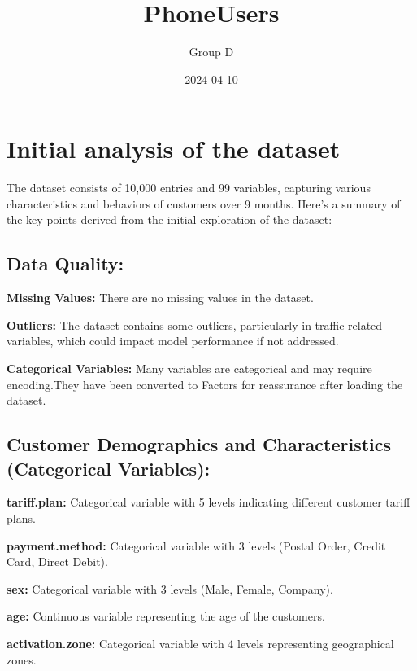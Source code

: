\documentclass[
]{article}
\title{PhoneUsers}
\author{Group D}
\date{2024-04-10}
\begin{document}
\maketitle

\hypertarget{initial-analysis-of-the-dataset}{%
\section{Initial analysis of the
dataset}\label{initial-analysis-of-the-dataset}}

The dataset consists of 10,000 entries and 99 variables, capturing
various characteristics and behaviors of customers over 9 months. Here's
a summary of the key points derived from the initial exploration of the
dataset:

\hypertarget{data-quality}{%
\subsection{Data Quality:}\label{data-quality}}

\textbf{Missing Values:} There are no missing values in the dataset.

\textbf{Outliers:} The dataset contains some outliers, particularly in
traffic-related variables, which could impact model performance if not
addressed.

\textbf{Categorical Variables:} Many variables are categorical and may
require encoding.They have been converted to Factors for reassurance
after loading the dataset.

\hypertarget{customer-demographics-and-characteristics-categorical-variables}{%
\subsection{Customer Demographics and Characteristics (Categorical
Variables):}\label{customer-demographics-and-characteristics-categorical-variables}}

\textbf{tariff.plan:} Categorical variable with 5 levels indicating
different customer tariff plans.

\textbf{payment.method:} Categorical variable with 3 levels (Postal
Order, Credit Card, Direct Debit).

\textbf{sex:} Categorical variable with 3 levels (Male, Female,
Company).

\textbf{age:} Continuous variable representing the age of the customers.

\textbf{activation.zone:} Categorical variable with 4 levels
representing geographical zones.
\end{document}
